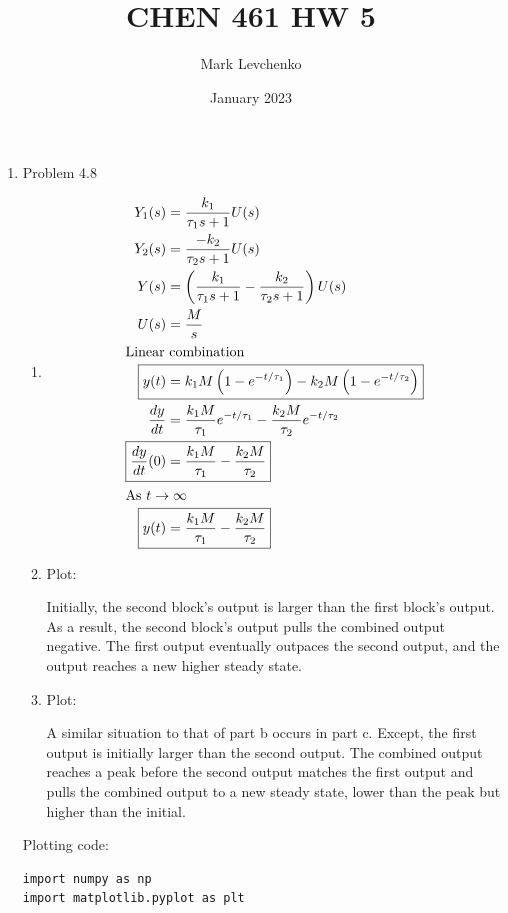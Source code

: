 \documentclass[12pt]{article}
\title{CHEN 461 HW 5}
\author{Mark Levchenko}
\date{January 2023}
\begin{document}
\begin{enumerate}

\newpage
\item Problem 4.8
\begin{enumerate}
    \item 
    \begin{align*}
        Y_1(s) &= \frac{k_1}{\tau_1 s + 1} U(s) \\
        Y_2(s) &= \frac{-k_2}{\tau_2 s + 1} U(s) \\
        Y(s) &= \left(\frac{k_1}{\tau_1 s + 1} - \frac{k_2}{\tau_2 s + 1}\right) U(s) \\
        U(s) &= \frac{M}{s} \\
        \intertext{Linear combination}
        \Aboxed{y(t) &= k_1 M \left(1 - e^{-t/\tau_1}\right) - k_2 M \left(1 - e^{-t/\tau_2}\right)} \\
        \frac{dy}{dt} &= \frac{k_1 M}{\tau_1} e^{-t/\tau_1} - \frac{k_2 M}{\tau_2} e^{-t/\tau_2} \\
        \Aboxed{\frac{dy}{dt}(0) &= \frac{k_1 M}{\tau_1} - \frac{k_2 M}{\tau_2} }\\
        \intertext{As $t\rightarrow\infty$}
        \Aboxed{y(t) &= \frac{k_1 M}{\tau_1} - \frac{k_2 M}{\tau_2}}
    \end{align*}
    \item Plot:

    

    Initially, the second block's output is larger than the first block's output. As a result, the second block's output pulls the combined output negative. The first output eventually outpaces the second output, and the output reaches a new higher steady state.
    
    \item Plot:

    

    A similar situation to that of part b occurs in part c. Except, the first output is initially larger than the second output. The combined output reaches a peak before the second output matches the first output and pulls the combined output to a new steady state, lower than the peak but higher than the initial.
    
\end{enumerate}

Plotting code:

\begin{verbatim}
import numpy as np
import matplotlib.pyplot as plt


\end{verbatim}
\end{enumerate}
\end{document}
